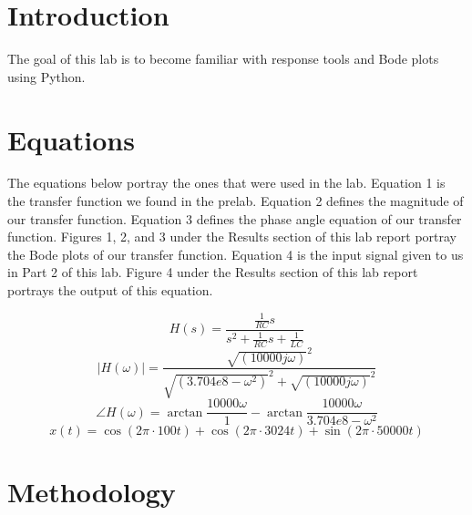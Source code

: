 \documentclass[12pt]{report}
\begin{document}
\section{Introduction}
 

The goal of this lab is to become familiar with response tools and Bode plots using Python. 


   

\section{Equations}
{The equations below portray the ones that were used in the lab. Equation 1 is the transfer function we found in the prelab. Equation 2 defines the magnitude of our transfer function. Equation 3 defines the phase angle equation of our transfer function. Figures 1, 2, and 3 under the Results section of this lab report portray the Bode plots of our transfer function. Equation 4 is the input signal given to us in Part 2 of this lab. Figure 4 under the Results section of this lab report portrays the output of this equation.} 
 
\begin{equation}
    H(s) = \frac{\frac{1}{RC}s}{s^{2}+\frac{1}{RC}s+\frac{1}{LC}}
\end{equation}
\begin{equation}
    |H(\omega)| = \frac{\sqrt{(10000j\omega)}^{2}}{\sqrt{(3.704e8-\omega^{2})}^{2}+\sqrt{(10000j\omega)}^{2}}
\end{equation}
\begin{equation}
    \angle H(\omega) = \arctan \frac{10000\omega}{1}-\arctan \frac{10000\omega}{3.704e8-\omega^{2}}
\end{equation}
\begin{equation}
    x(t) = \cos({2\pi \cdot 100t}) + \cos({2\pi \cdot 3024t}) + \sin({2\pi \cdot 50000t})
\end{equation}

\section{Methodology}
\end{document}
